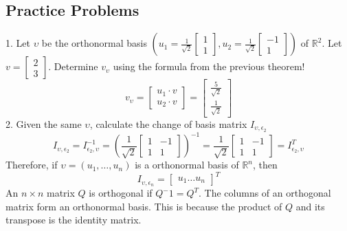 \begin{enumerate}
\subsection{Practice Problems}
1. Let $\upsilon$ be the orthonormal basis $(u_1 = \frac{1}{\sqrt{2}}\begin{bmatrix}1 \\ 1\end{bmatrix}, 
u_2 = \frac{1}{\sqrt{2}} \begin{bmatrix}-1 \\ 1\end{bmatrix})$ of $\mathbb{R}^2$. Let $v = \begin{bmatrix}
2 \\ 3 \end{bmatrix}$. Determine $v_\upsilon$ using the formula from the previous theorem! 
\[
  v_\upsilon = \begin{bmatrix} u_1 \cdot v \\ u_2 \cdot v \end{bmatrix} = \begin{bmatrix} 
\frac{5}{\sqrt{2}} \\ \frac{1}{\sqrt{2}} \end{bmatrix}
\]
2. Given the same $\upsilon$, calculate the change of basis matrix 
$I_{\upsilon, \epsilon_2}$
\[
  I_{\upsilon, \epsilon_2} = I^{-1}_{\epsilon_2, \upsilon} = (\frac{1}{\sqrt{2}} 
  \begin{bmatrix} 1 & -1 \\ 1 & 1 \end{bmatrix})^{-1} = \frac{1}{\sqrt{2}} 
  \begin{bmatrix} 1 & -1 \\ 1 & 1 \end{bmatrix} = I^T_{\epsilon_2, \upsilon}
\] Therefore, if $\upsilon = (u_1, \dots, u_n)$ is a orthonormal basis of 
$\mathbb{R}^n$, then 
\[
  I_{\upsilon, \epsilon_n} = \begin{bmatrix} u_1 \dots u_n \end{bmatrix}^T
\]
An $n \times n$ matrix $Q$ is orthogonal if $Q^-1 = Q^T$. The columns of an orthogonal 
matrix form an orthonormal basis. This is because the product of $Q$ and its transpose
is the identity matrix. 

\end{enumerate}
